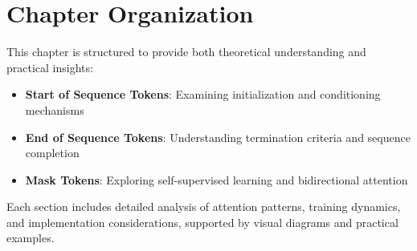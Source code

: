 \section{Chapter Organization}

This chapter is structured to provide both theoretical understanding and practical insights:

\begin{itemize}
\item \textbf{Start of Sequence Tokens}: Examining initialization and conditioning mechanisms
\item \textbf{End of Sequence Tokens}: Understanding termination criteria and sequence completion
\item \textbf{Mask Tokens}: Exploring self-supervised learning and bidirectional attention
\end{itemize}

Each section includes detailed analysis of attention patterns, training dynamics, and implementation considerations, supported by visual diagrams and practical examples.
